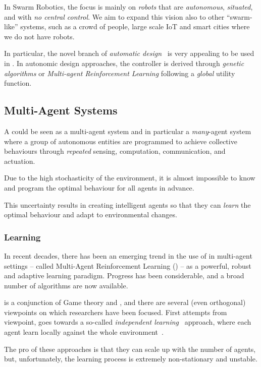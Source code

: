\documentclass[11pt]{article}
\begin{document}
In Swarm Robotics, the focus is mainly on \textit{robots} that are \emph{autonomous}, \emph{situated}, and with \emph{no central control}. We aim to expand this vision also to other ``swarm-like'' systems, such as a crowd of people, large scale IoT and smart cities where we do not have robots. 

In particular, the novel branch of \textit{automatic design}~\cite{DBLP:journals/firai/FrancescaB16} is very appealing to be used in \cpsw{}. In autonomic design approaches, the controller is derived through \textit{genetic algorithms} or \textit{Multi-agent Reinforcement Learning} following a \textit{global} utility function. 
\subsection{Multi-Agent Systems}
A \cpsw{} could be seen as a multi-agent system and in particular a \emph{many}-agent system where a group of autonomous entities are programmed to achieve collective behaviours through \emph{repeated} sensing, computation, communication, and actuation.

Due to the high stochasticity of the environment, it is almost impossible to know and program the optimal behaviour for all agents in advance.

This uncertainty results in creating intelligent agents so that they can \emph{learn} the optimal behaviour and adapt to environmental changes.
\subsubsection{Learning}
In recent decades, there has been an emerging trend in the use of \rl{} 
in multi-agent settings -- called Multi-Agent Reinforcement Learning (\marl{}) -- as a powerful, robust and adaptive learning paradigm.
%
Progress has been considerable, and a broad number of algorithms are now available.

\marl{} is a conjunction of Game theory and \rl{}, 
 and there are several (even orthogonal) viewpoints on which researchers have been focused.
First attempts from \rl{} viewpoint, 
 goes towards a so-called \textit{independent learning}~\cite{DBLP:journals/tsmc/BusoniuBS08} approach, where each agent learn locally against the whole environment~\cite{DBLP:conf/icml/Tan93}.

The pro of these approaches is that they can scale up with the number of agents, 
 but, unfortunately, the learning process is extremely non-stationary and unstable.
% 
\end{document}
